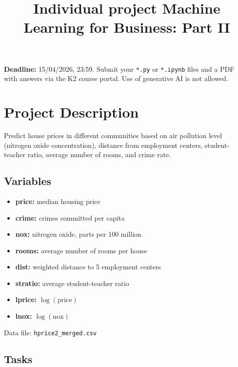 \documentclass{article}
\title{Individual project Machine Learning for Business: Part II}
\author{}
\date{}
\begin{document}
\maketitle

\textbf{Deadline:} 15/04/2026, 23:59. Submit your \texttt{*.py} or \texttt{*.ipynb} files and a PDF with answers via the K2 course portal. Use of generative AI is not allowed.

\section*{Project Description}

Predict house prices in different communities based on air pollution level (nitrogen oxide concentration), distance from employment centers, student-teacher ratio, average number of rooms, and crime rate.

\subsection*{Variables}
\begin{itemize}
  \item \textbf{price:} median housing price
  \item \textbf{crime:} crimes committed per capita
  \item \textbf{nox:} nitrogen oxide, parts per 100 million
  \item \textbf{rooms:} average number of rooms per house
  \item \textbf{dist:} weighted distance to 5 employment centers
  \item \textbf{stratio:} average student-teacher ratio
  \item \textbf{lprice:} $\log(\text{price})$
  \item \textbf{lnox:} $\log(\text{nox})$
\end{itemize}

Data file: \lstinline|hprice2_merged.csv|

\subsection*{Tasks}
\end{document}
